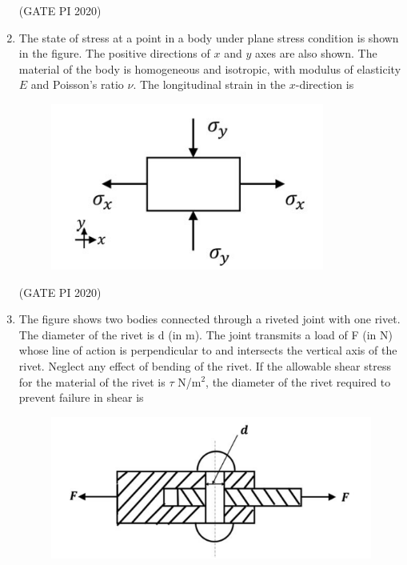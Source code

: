 \documentclass[journal,12pt,onecolumn]{IEEEtran}
\theoremstyle{remark}
\begin{document}
\begin{enumerate}
\hfill (GATE PI 2020)

\item The state of stress at a point in a body under plane stress condition is shown in the figure. The positive directions of $x$ and $y$ axes are also shown. The material of the body is homogeneous and isotropic, with modulus of elasticity $E$ and Poisson's ratio $\nu$. The longitudinal strain in the $x$-direction is
\begin{figure}[H]
    \centering
    \includegraphics[width=0.5\columnwidth]{figs/fig8.png}
    \caption{}
    \label{fig:placeholder}
\end{figure}

\begin{enumerate}
\end{enumerate}

\hfill (GATE PI 2020)

\item The figure shows two bodies connected through a riveted joint with one rivet. The diameter of the rivet is d (in m). The joint transmits a load of F (in N) whose line of action is perpendicular to and intersects the vertical axis of the rivet. Neglect any effect of bending of the rivet. If the allowable shear stress for the material of the rivet is $\tau$ N/m$^2$, the diameter of the rivet required to prevent failure in shear is

\begin{figure}[H]
    \centering
    \includegraphics[width=0.5\columnwidth]{figs/fig9.png}
    \caption{}
    \label{fig:placeholder}
\end{figure}


\end{enumerate}
\end{document}

